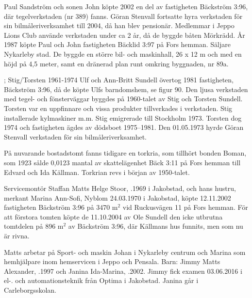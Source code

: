Paul Sandström och sonen John köpte 2002 en del av fastigheten Bäckström 3:96, där tegelverkstaden (nr 389) fanns. Göran Stenvall fortsatte hyra	verkstaden för sin bilmåleriverksamhet till 2004, då han blev pensionär. Medlemmar i Jeppo Lions Club använde verkstaden under ca 2 år, då de 	byggde båten Mörkrädd. År 1987 köpte Paul och John fastigheten Bäcklid 3:97 på Fors hemman. Säljare Nykarleby stad. De byggde en större bil- och maskinhall, 26 x 12 m och med en höjd på 4,5 meter, samt en dränerad plan runt omkring byggnaden, nr 89a.


; Stig/Torsten	1961-1974
Ulf och Ann-Britt Sundell övertog 1981 fastigheten, Bäckström 3:96, då de köpte Ulfs barndomshem, se figur 90. Den ljusa verkstaden med tegel- och fönsterväggar byggdes på 1960-talet av Stig och Torsten Sundell. Torsten var en uppfinnare och vissa produkter tillverkades i 	verkstaden. Stig installerade kylmaskiner m.m. Stig emigrerade till Stockholm 1973. Torsten dog 1974 och fastigheten ägdes av dödsboet 1975--1981. Den 01.05.1973 hyrde Göran Stenvall verkstaden för sin bilmåleriverksamhet.


På nuvarande bostadstomt fanns tidigare en torkria, som tillhört bonden	Boman, som 1923 sålde 0,0123 mantal av skattelägenhet Bäck 3:11 på 	Fors hemman till Edvard och Ida Källman. Torkrian revs i början av	1950-talet.






Servicemontör Staffan Matts Helge Stoor, .1969 i Jakobstad,	och hans hustru, merkant  Marina Ann-Sofi, \textborn Nyblom 24.03.1970 i Jakobstad, köpte 12.11.2002 fastigheten Bäckström 3:96 på 3470	m$^2$  vid Ruckusvägen 11 på Fors hemman. För att förstora tomten köpte de 11.10.2004 av Ole Sundell den icke utbrutna tomtdelen på 896 m$^2$ av Bäckström 3:96, där Källmans hus funnits, men som nu är rivna.

Matts arbetar på Sport- och maskin Johan i Nykarleby centrum och 	Marina som hemhjälpare inom hemservicen i Jeppo och Pensala.	Barn:	Jimmy Matts Alexander, .1997	och Janina Ida-Marina,	.2002.	Jimmy fick examen 03.06.2016 i el-. och automationsteknik från 	Optima i Jakobstad. Janina går i Carleborgsskolan.


